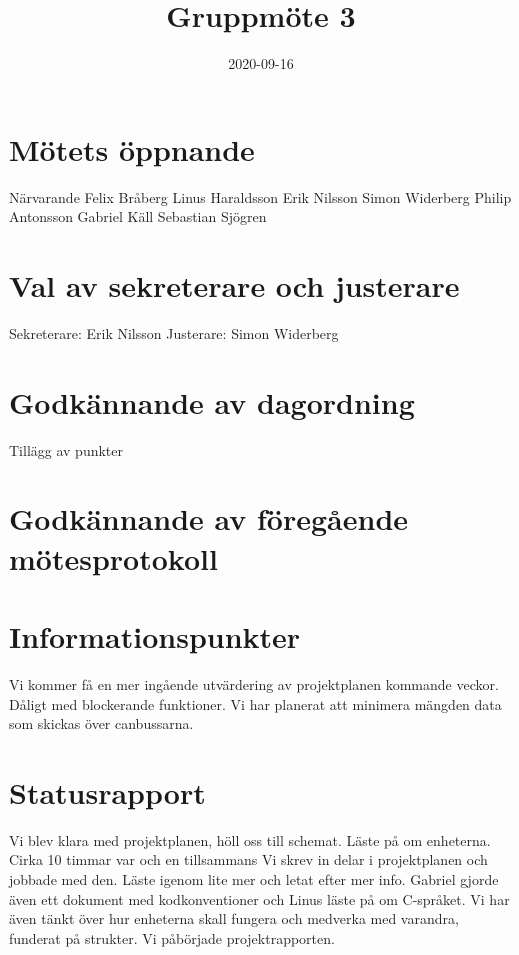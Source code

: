 \documentclass[a4paper]{article}
\begin{document}
\title{Gruppmöte 3}
\date{2020-09-16}
\maketitle

\section{Mötets öppnande}
\label{sec:roller}
Närvarande
Felix Bråberg
Linus Haraldsson
Erik Nilsson
Simon Widerberg
Philip Antonsson
Gabriel Käll
Sebastian Sjögren

\section{Val av sekreterare och justerare}
\label{sec:val}
Sekreterare: Erik Nilsson
\newline
Justerare:  Simon Widerberg


\section{Godkännande av dagordning}
\label{sec:godk}
Tillägg av punkter






\section{Godkännande av föregående mötesprotokoll}
\label{sec:godk}






\section{Informationspunkter}
\label{sec:inf}
Vi kommer få en mer ingående utvärdering av projektplanen kommande veckor.
Dåligt med blockerande funktioner.
Vi har planerat att minimera mängden data som skickas över canbussarna.




\section{Statusrapport}
\label{sec:stat}
Vi blev klara med projektplanen, höll oss till schemat. Läste på om enheterna. Cirka 10 timmar var och en tillsammans
\newline \newline
Vi skrev in delar i projektplanen och jobbade med den. Läste igenom lite mer och letat efter mer info. Gabriel gjorde även ett dokument med kodkonventioner och Linus läste på om C-språket. Vi har även tänkt över hur enheterna skall fungera och medverka med varandra, funderat på strukter. Vi påbörjade projektrapporten.
\end{document}
